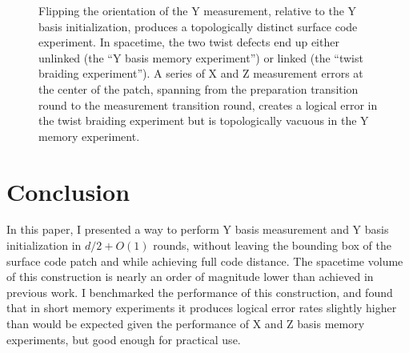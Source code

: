 \documentclass[onecolumn,unpublished,a4paper]{quantumarticle}
\theoremstyle{definition}
\theoremstyle{definition}
\theoremstyle{definition}
\begin{document}
\begin{figure}
    \centering
    \caption{
        Flipping the orientation of the Y measurement, relative to the Y basis initialization, produces a topologically distinct surface code experiment.
        In spacetime, the two twist defects end up either unlinked (the ``Y basis memory experiment'') or linked (the ``twist braiding experiment'').
        A series of X and Z measurement errors at the center of the patch, spanning from the preparation transition round to the measurement transition round, creates a logical error in the twist braiding experiment but is topologically vacuous in the Y memory experiment.
    }
    \label{fig:contractible_vs_topological_error}
\end{figure}


\section{Conclusion}
\label{sec:conclusion}

In this paper, I presented a way to perform Y basis measurement and Y basis initialization in $d/2 + O(1)$ rounds, without leaving the bounding box of the surface code patch and while achieving full code distance.
The spacetime volume of this construction is nearly an order of magnitude lower than achieved in previous work.
I benchmarked the performance of this construction, and found that in short memory experiments it produces logical error rates slightly higher than would be expected given the performance of X and Z basis memory experiments, but good enough for practical use.
\end{document}
